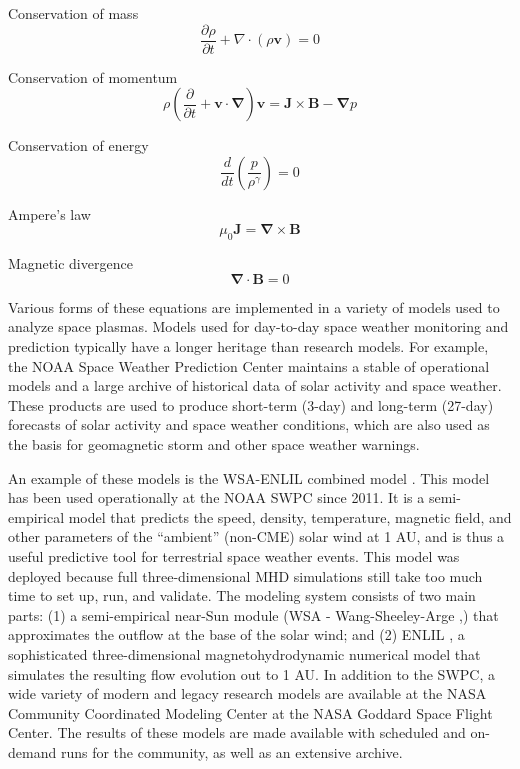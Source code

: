 \documentclass{article}
\begin{document}
Conservation of mass
\begin{equation}
  \frac {\partial \rho} {\partial t} + \nabla \cdotp (\rho \mathbf v) = 0
  \label{eq:mhd_conservationofmass}
\end{equation}

Conservation of momentum
\begin{equation}
  \rho \left( \frac {\partial} {\partial t} + \mathbf v \cdotp \mathbf \nabla \right) \mathbf v = \mathbf J \times \mathbf B - \mathbf \nabla p
  \label{eq:mhd_conservationofmomentum}
\end{equation}

Conservation of energy
\begin{equation}
  \frac {d} {dt} \left( \frac {p} {\rho^{\gamma}} \right) = 0
  \label{eq:mhd_conservationofenergy}
\end{equation}

Ampere's law
\begin{equation}
  \mu_0 \mathbf J = \mathbf \nabla \times \mathbf B
  \label{eq:mhd_ampereslaw}
\end{equation}

Magnetic divergence
\begin{equation}
  \mathbf \nabla \cdotp \mathbf B = 0
  \label{eq:mhd_magneticdivergence}
\end{equation}

Various forms of these equations are implemented in a variety of models used to analyze space plasmas. Models used for day-to-day space weather monitoring and prediction typically have a longer heritage than research models. For example, the NOAA Space Weather Prediction Center \cite{swpc} maintains a stable of operational models and a large archive of historical data of solar activity and space weather. These products are used to produce short-term (3-day) and long-term (27-day) forecasts of solar activity and space weather conditions, which are also used as the basis for geomagnetic storm and other space weather warnings.

An example of these models is the WSA-ENLIL combined model \cite{wsaenlil}. This model has been used operationally at the NOAA SWPC since 2011. It is a semi-empirical model that predicts the speed, density, temperature, magnetic field, and other parameters of the “ambient” (non-CME) solar wind at 1 AU, and is thus a useful predictive tool for terrestrial space weather events. This model was deployed because full three-dimensional MHD simulations still take too much time to set up, run, and validate. The modeling system consists of two main parts: (1)  a semi-empirical near-Sun module (WSA - Wang-Sheeley-Arge \cite{Arge2000},\cite{SheeleyJr2017}) that approximates the outflow at the base of the solar wind; and (2) ENLIL \cite{enlil}, a sophisticated three-dimensional magnetohydrodynamic numerical model that simulates the resulting flow  evolution out to 1 AU. In addition to the SWPC, a wide variety of modern and legacy research models are available at the NASA Community Coordinated Modeling Center \cite{ccmc} at the NASA Goddard Space Flight Center. The results of these models are made available with scheduled and on-demand runs for the community, as well as an extensive archive.
\end{document}
